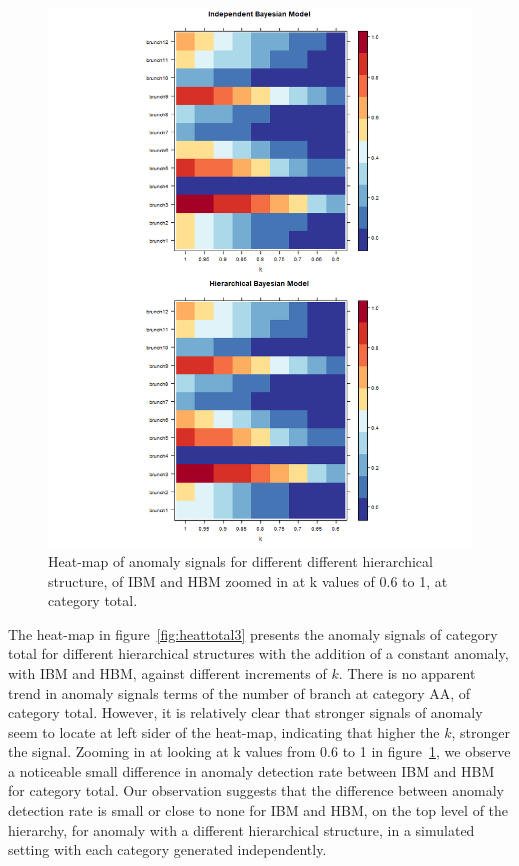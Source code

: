		\begin{figure}[!h]
			\centering
			\includegraphics[width=1\linewidth]{../../R-codes/JAGS/plots/sim2/heattotal2}
			\caption{Heat-map of anomaly signals for different different hierarchical structure, of IBM and HBM zoomed in at k values of 0.6 to 1, at category total.}
			\label{fig:heattotal3h}
		\end{figure}
		
		\newpage
		
		The heat-map in figure~\ref{fig:heattotal3} presents the anomaly signals of category total for different hierarchical structures with the addition of a constant anomaly, with IBM and HBM, against different increments of $k$. There is no apparent trend in anomaly signals terms of the number of branch at category AA, of category total. However,  it is relatively clear that stronger signals of anomaly seem to locate at left sider of the heat-map, indicating that higher the $k$, stronger the signal. Zooming in at looking at k values from 0.6 to 1 in figure~\ref{fig:heattotal3h}, we observe a noticeable small difference in anomaly detection rate between IBM and HBM for category total. Our observation suggests that the difference between anomaly detection rate is small or close to none for IBM and HBM, on the top level of the hierarchy, for anomaly with a different hierarchical structure, in a simulated setting with each category generated independently. 
		
